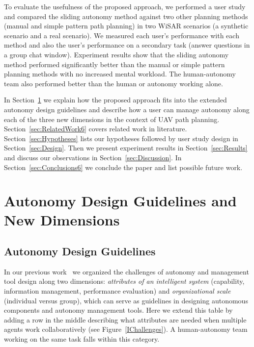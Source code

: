 \documentclass[lettersize, apacite, twoside, HRI]{apa_HRI}
\begin{document}
To evaluate the usefulness of the proposed approach, we performed a user study and compared the sliding autonomy method against two other planning methods (manual and simple pattern path planning) in two WiSAR scenarios (a synthetic scenario and a real scenario). We measured each user's performance with each method and also the user's performance on a secondary task (answer questions in a group chat window). Experiment results show that the sliding autonomy method performed significantly better than the manual or simple pattern planning methods with no increased mental workload. The human-autonomy team also performed better than the human or autonomy working alone.

In Section~\ref{sec:dimensions} we explain how the proposed approach fits into the extended autonomy design guidelines and describe how a user can manage autonomy along each of the three new dimensions in the context of UAV path planning. Section~\ref{sec:RelatedWork6} covers related work in literature. Section~\ref{sec:Hypotheses} lists our hypotheses followed by user study design in Section~\ref{sec:Design}. Then we present experiment results in Section~\ref{sec:Results} and discuss our observations in Section~\ref{sec:Discussion}. In Section~\ref{sec:Conclusions6} we conclude the paper and list possible future work.

\section{Autonomy Design Guidelines and New Dimensions}
\label{sec:dimensions}

\subsection{Autonomy Design Guidelines}

In our previous work~\cite{Lin2010Supporting} we organized the challenges of autonomy and management tool design along two dimensions: \textit{attributes of an intelligent system} (capability, information management, performance evaluation) and \textit{organizational scale} (individual versus group), which can serve as guidelines in designing autonomous components and autonomy management tools. Here we extend this table by adding a row in the middle describing what attributes are needed when multiple agents work collaboratively (see Figure~\ref{IChallenges}). A human-autonomy team working on the same task falls within this category. 
\end{document}
